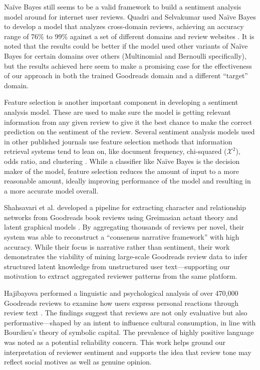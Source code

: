 Na\"ive Bayes still seems to be a valid framework to build a sentiment analysis model around for
internet user reviews. Quadri and Selvakumar used Na\"ive Bayes to develop a model that analyzes cross-domain
reviews, achieving an accuracy range of 76\% to 99\% against a set of different domains and review websites 
\cite{Quadri2020}. It is noted that the results could be better if the model used other variants of Na\"ive Bayes
for certain domains over others (Multinomial and Bernoulli specifically), but the results achieved here seem to make
a promising case for the effectiveness of our approach in both the trained Goodreads domain and a different
``target'' domain.

Feature selection is another important component in developing a sentiment analysis model. These are used to make
sure the model is getting relevant information from any given review to give it the best chance to make the correct
prediction on the sentiment of the review. Several sentiment analysis models used in other published journals use
feature selection methods that information retrieval systems tend to lean on, like document frequency, chi-squared ($\mathcal{X}^2$),
odds ratio, and clustering \cite{Hung2015}. While a classifier like Na\"ive Bayes is the decision maker of the model, feature selection
reduces the amount of input to a more reasonable amount, ideally improving performance of the model and resulting
in a more accurate model overall.

Shahsavari et al. developed a pipeline for extracting character and relationship networks from Goodreads book reviews using Greimasian actant theory and latent graphical models \cite{shahsavari2020}. By aggregating thousands of reviews per novel, their system was able to reconstruct a ``consensus narrative framework'' with high accuracy. While their focus is narrative rather than sentiment, their work demonstrates the viability of mining large-scale Goodreads review data to infer structured latent knowledge from unstructured user text—supporting our motivation to extract aggregated reviewer patterns from the same platform.

Hajibayova performed a linguistic and psychological analysis of over 470,000 Goodreads reviews to examine how users express personal reactions through review text \cite{hajibayova2019}. The findings suggest that reviews are not only evaluative but also performative—shaped by an intent to influence cultural consumption, in line with Bourdieu’s theory of symbolic capital. The prevalence of highly positive language was noted as a potential reliability concern. This work helps ground our interpretation of reviewer sentiment and supports the idea that review tone may reflect social motives as well as genuine opinion.
